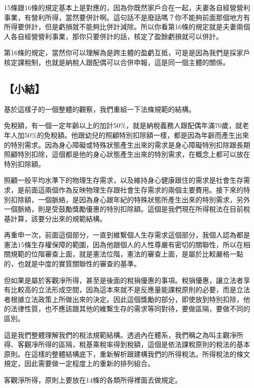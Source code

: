 \documentclass[oneside,sub3section]{ctexbook}
\begin{document}
15條跟16條的規定基本上是對應的，因為你既然家戶合在一起，夫妻各自經營營利事業，有營利所得，當然要併計啊。這句話不是廢話嗎？你不能夠前面那個地方有所得要併計，但是虧損就不能夠比併計減除。所以你看第16條的規定就是夫妻兩個人各自經營營利事業，那你只要併計的話，核定了盈餘虧損就可以併計。

第16條的規定，當然你可以理解為是跨主體的盈虧互抵，可是是因為我們是採家戶核定課稅制，也就是納稅人跟配偶可以合併申報，這是同一個主體的關係。

\hypertarget{ux5c0fux7d50-1}{%
\subsection{【小結】}\label{ux5c0fux7d50-1}}

基於這樣子的一個整體的觀察，我們重組一下法條規範的結構。

免稅額，有一個一定年齡以上的加計50\%，就是納稅義務人跟配偶年滿70歲，就老年人加50\%的免稅額。他跟幼兒的照顧特別扣除額一樣，都是因為年齡而產生出來的特別需求。因為身心障礙或特殊狀態產生出來的需求是身心障礙特別扣除跟長期照顧特別扣除，這個都是他的身心狀態產生出來的特別需求，在概念上都可以放在特別扣除額。

照顧一般平均水準下的物理生存需求，以及維持身心健康跟住的需求是社會生存需求，是前面這兩個作為反映物理生存跟社會生存需求的兩個主要費用。接下來的特別扣除額，一個脈絡，是因為身心跟年紀的特殊狀態所產生出來的特別需求，另外一個脈絡，則是受鼓勵獎勵優惠的特別扣除額。這個是我們現在所得稅法在目前稅基計算，該要分出來的規範結構。

再重申一次，前面這個部分，一直到維繫個人生存需求這個部分，我個人認為都是憲法15條生存權保障的範圍，因為他跟個人的人性尊嚴有密切的關聯性，所以在相關規範的位階審查上面，就是憲法位階，憲法的審查上面，是屬於比較嚴格一點的，也就是中度的實質關聯性的審查的基準。

但如果是屬於客觀凈所得，甚至是後面的稅捐優惠的事項。稅捐優惠，讓立法者享有比較高的立法形成空間，因為這本來就不是反應量能課稅原則的必要，而是立法者根據立法政策上所做出來的決定。因此這個獎勵的部分，即使放到特別扣除，他的法律性質，也不應該跟其他的維繫生存的需求等同對待，要做區隔，要做不同的區別。

這是我們整體理解我們的稅法規範結構。透過內在體系，我們稱之為叫主觀凈所得、客觀凈所得的區隔，稅基乘稅率得到稅額，這個是依法課稅原則的稅法的基本原則。在這樣的整體結構底下，重新解析跟建構我們的所得稅法。所得稅法的條文規定，因此需要做一定程度上的重新的排列組合。

客觀淨所得，原則上要放在14條的各類所得裡面去做規定。
\end{document}
